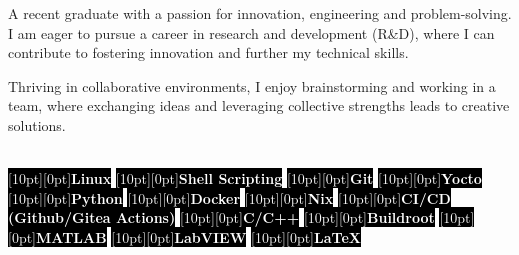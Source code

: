 \documentclass[9pt]{./src/packages/Developer_CV/developercv}
\begin{document}
\noindent %
\begin{minipage}[t]{0.60\textwidth} %

    \raggedright

    A recent graduate with a passion for innovation, engineering and
    problem-solving. I am eager to pursue a career in research and development (R\&D),
    where I can contribute to fostering innovation and further my
    technical skills.

    Thriving in collaborative environments, I enjoy brainstorming and working in
    a team, where exchanging ideas and leveraging collective strengths leads to
    creative solutions.

\end{minipage}
\hfill %
\begin{minipage}[t]{0.35\textwidth}
    \raggedright %
    \\
    \colorbox{black}{\textcolor{white}{\raisebox{0.5ex}[10pt][0pt]{\textbf{Linux}}}}
    \colorbox{black}{\textcolor{white}{\raisebox{0.5ex}[10pt][0pt]{\textbf{Shell Scripting}}}}
    \colorbox{black}{\textcolor{white}{\raisebox{0.5ex}[10pt][0pt]{\textbf{Git}}}}
    \colorbox{black}{\textcolor{white}{\raisebox{0.5ex}[10pt][0pt]{\textbf{Yocto}}}}
    \colorbox{black}{\textcolor{white}{\raisebox{0.5ex}[10pt][0pt]{\textbf{Python}}}}
    \colorbox{black}{\textcolor{white}{\raisebox{0.5ex}[10pt][0pt]{\textbf{Docker}}}}
    \colorbox{black}{\textcolor{white}{\raisebox{0.5ex}[10pt][0pt]{\textbf{Nix}}}}
    \colorbox{black}{\textcolor{white}{\raisebox{0.5ex}[10pt][0pt]{\textbf{CI/CD (Github/Gitea Actions)}}}}
    \colorbox{black}{\textcolor{white}{\raisebox{0.5ex}[10pt][0pt]{\textbf{C/C++}}}}
    \colorbox{black}{\textcolor{white}{\raisebox{0.5ex}[10pt][0pt]{\textbf{Buildroot}}}}
    \colorbox{black}{\textcolor{white}{\raisebox{0.5ex}[10pt][0pt]{\textbf{MATLAB}}}}
    \colorbox{black}{\textcolor{white}{\raisebox{0.5ex}[10pt][0pt]{\textbf{LabVIEW}}}}
    \colorbox{black}{\textcolor{white}{\raisebox{0.5ex}[10pt][0pt]{\textbf{LaTeX}}}}
    \\
\end{minipage}

\end{document}
